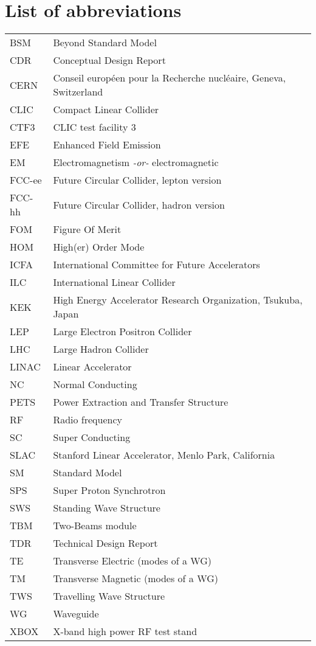 \chapter*{List of abbreviations}

\begin{tabular}{l l}
BSM		&	Beyond Standard Model\\
CDR		&	Conceptual Design Report\\
CERN	&	Conseil europ\'een pour la Recherche nucl\'eaire, Geneva, Switzerland\\
CLIC		&	Compact Linear Collider\\
CTF3	&	CLIC test facility 3\\
EFE		&	Enhanced Field Emission\\
EM		&	Electromagnetism \textit{-or-} electromagnetic\\
FCC-ee	&	Future Circular Collider, lepton version\\
FCC-hh	&	Future Circular Collider, hadron version\\
FOM		&	Figure Of Merit\\
HOM		&	High(er) Order Mode\\
ICFA		&	International Committee for Future Accelerators\\
ILC		&	International Linear Collider\\
KEK		&	High Energy Accelerator Research Organization, Tsukuba, Japan      \\  
LEP		&	Large Electron Positron Collider\\
LHC		&	Large Hadron Collider \\
LINAC	&	Linear Accelerator\\
NC		&	Normal Conducting\\
PETS	&	Power Extraction and Transfer Structure\\
RF		&	Radio frequency\\
SC		&	Super Conducting\\
SLAC	&	Stanford Linear Accelerator, Menlo Park, California\\
SM		&	Standard Model\\
SPS		&	Super Proton Synchrotron\\
SWS		&	Standing Wave Structure\\
TBM		&	Two-Beams module\\
TDR		&	Technical Design Report\\
TE		&	Transverse Electric (modes of a WG)\\
TM		&	Transverse Magnetic (modes of a WG)\\
TWS		&	Travelling Wave Structure\\
WG		&	Waveguide\\
XBOX	&	X-band high power RF test stand\\
\end{tabular}
